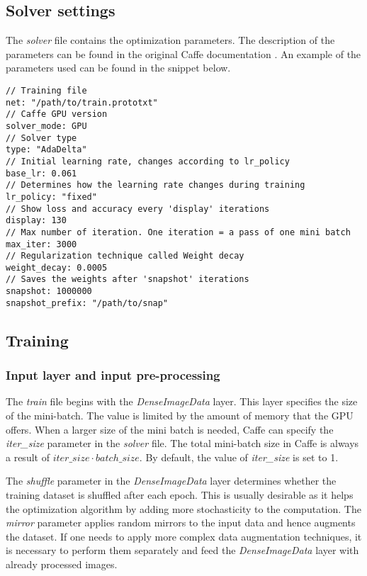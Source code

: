 \subsection{Solver settings}

The \textit{solver} file contains the optimization parameters. The description of the parameters can be found in the original Caffe documentation \cite{caffe}. An example of the parameters used can be found in the snippet below. 

\begin{lstlisting}[caption={Contents of \textit{solver.prototxt} \cite{filip_github}},captionpos=b]
// Training file
net: "/path/to/train.prototxt"	
// Caffe GPU version
solver_mode: GPU
// Solver type		
type: "AdaDelta"
// Initial learning rate, changes according to lr_policy		
base_lr: 0.061		
// Determines how the learning rate changes during training
lr_policy: "fixed"	
// Show loss and accuracy every 'display' iterations
display: 130
// Max number of iteration. One iteration = a pass of one mini batch			
max_iter: 3000	
// Regularization technique called Weight decay		
weight_decay: 0.0005
// Saves the weights after 'snapshot' iterations
snapshot: 1000000		
snapshot_prefix: "/path/to/snap" 
\end{lstlisting}

\subsection{Training}

\subsubsection{Input layer and input pre-processing}

The \textit{train} file begins with the \textit{DenseImageData} layer. This layer specifies the size of the mini-batch. The value is limited by the amount of memory that the GPU offers. When a larger size of the mini batch is needed, Caffe can specify the \textit{iter\_size} parameter in the \textit{solver} file. The total mini-batch size in Caffe is always a result of $iter\_size \cdot batch\_size$. By default, the value of \textit{iter\_size} is set to 1. \cite{caffe}

The \textit{shuffle} parameter in the \textit{DenseImageData} layer determines whether the training dataset is shuffled after each epoch. This is usually desirable as it helps the optimization algorithm by adding more stochasticity to the computation. The \textit{mirror} parameter applies random mirrors to the input data and hence augments the dataset. If one needs to apply more complex data augmentation techniques, it is necessary to perform them separately and feed the \textit{DenseImageData} layer with already processed images. \cite{caffe}


